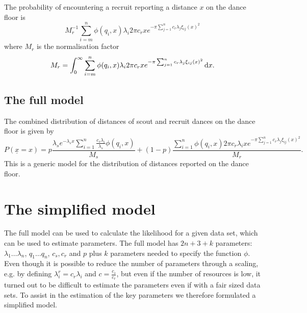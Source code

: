 \documentclass[12pt,letter]{amsart}
\newcommand{\df}[0]{{\,\rm d }}
\begin{document}
The probability of encountering a recruit reporting a distance $x$ on the dance floor is
$$M_r^{-1}\sum_{i=m}^n  \phi(q_i, x)\lambda_i2 \pi c_r  x e^{- \pi \sum_{j=1}^n c_r \lambda_j \xi_{ij}(x)^2}
$$
where $M_r$ is the normalisation factor $$M_r=\int_0^\infty \sum_{i=m}^n  \phi(q_i, x)\lambda_i2 \pi c_r  x e^{- \pi \sum_{j=1}^n c_r \lambda_j \xi_{ij}(x)^2}\df x.$$

\subsection*{The full model}

The combined distribution of distances of scout and recruit dances on the dance floor is given by
$$P(\underline x= x )=p \frac{\lambda_s e^{-\lambda_s x}\sum_{i=1}^n  \frac{c_s \lambda_i}{\lambda_s} \phi(q_i, x) }{M_s} +(1-p)\frac{\sum_{i=1}^n  \phi(q_i, x)2 \pi c_r \lambda_i  x e^{- \pi \sum_{j=1}^n c_r \lambda_j \xi_{ij}(x)^2}}{M_r}.$$
This is a generic model for the distribution of distances reported on the dance floor.

\section*{The simplified model}

The full model can be used to calculate the likelihood for a given data set, which can be used to estimate parameters. The full model has $2 n+ 3 + k $  parameters: $\lambda_1 \dots \lambda_n$, $q_1 \dots q_n$, $c_s, c_r$ and $p$ plus $k$ parameters needed to specify the function $\phi$. Even though it is possible to reduce the number of parameters through a scaling, e.g. by defining $\lambda_i^r=c_r \lambda_i$ and $c=\frac{c_s}{c_r}$, but even if the number of resources is low, it turned out to be difficult to estimate the parameters even if with a fair sized data sets. To assist in the estimation of the key parameters we therefore formulated a simplified model.
\end{document}
